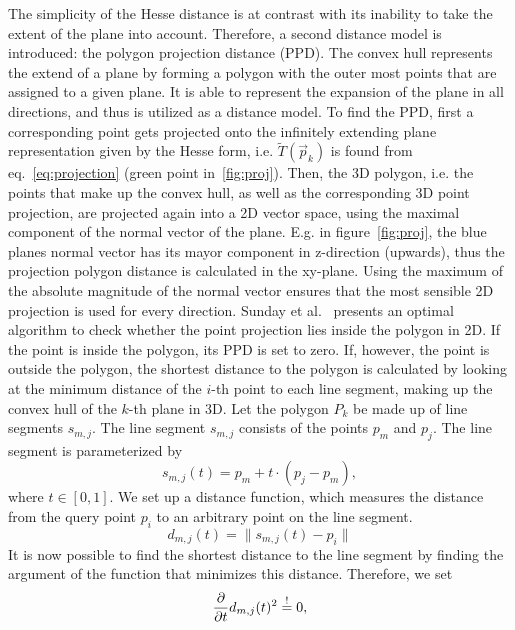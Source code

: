 The simplicity of the Hesse distance is at contrast with its inability to take the extent of the plane into account.
Therefore, a second distance model is introduced: the polygon projection distance (PPD).
The convex hull represents the extend of a plane by forming a polygon with the outer most points that are assigned to a given plane. 
It is able to represent the expansion of the plane in all directions, and thus is utilized as a distance model.
To find the PPD, first a corresponding point gets projected onto the infinitely extending plane representation given by the Hesse form, i.e. $\widetilde{T}(\vec{p}_k)$ is found from eq.~\eqref{eq:projection} (green point in~\ref{fig:proj}).
Then, the 3D polygon, i.e. the points that make up the convex hull, as well as the corresponding 3D point projection, are projected again into a 2D vector space, using the maximal component of the normal vector of the plane.
E.g. in figure~\ref{fig:proj}, the blue planes normal vector has its mayor component in z-direction (upwards), thus the projection polygon distance is calculated in the xy-plane.
Using the maximum of the absolute magnitude of the normal vector ensures that the most sensible 2D projection is used for every direction.
Sunday et al.~\cite{pga} presents an optimal algorithm to check whether the point projection lies inside the polygon in 2D. 
If the point is inside the polygon, its PPD is set to zero.
If, however, the point is outside the polygon, the shortest distance to the polygon is calculated by looking at the minimum distance of the $i$-th point to each line segment, making up the convex hull of the $k$-th plane in 3D.
Let the polygon $P_k$ be made up of line segments $s_{m, j}$.
The line segment $s_{m, j}$ consists of the points $p_m$ and $p_j$.
The line segment is parameterized by
\begin{equation}
\label{eq:line}
	s_{m, j}(t) = p_m + t \cdot \left( p_j - p_m \right) ,  
\end{equation}
where $t \in \left[ 0, 1 \right]$. 
We set up a distance function, which measures the distance from the query point $p_i$ to an arbitrary point on the line segment.
\begin{equation}
	\label{eq:dist}
	d_{m, j}(t) = \lVert s_{m, j}(t) - p_i \rVert 
\end{equation} 
It is now possible to find the shortest distance to the line segment by finding the argument of the function that minimizes this distance.
Therefore, we set
\begin{equation}
	\frac{\partial}{\partial t} d_{m, j}(t)^2 \overset{!}{=} 0 ,
\end{equation}  
